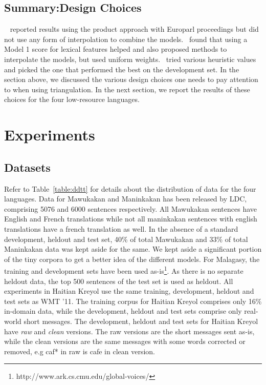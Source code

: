 \documentclass[11pt]{article}
\begin{document}
	

	\subsection{Summary:Design Choices}
		~ reported results using the product approach with Europarl proceedings but did not use any form of interpolation to combine the models.~ found that using a Model 1 score for lexical features helped and also proposed methods to interpolate the models, but used uniform weights.~ tried various heuristic values and picked the one that performed the best on the development set. In the section above, we discussed the various design choices one needs to pay attention to when using triangulation. In the next section, we report the results of these choices for the four low-resource languages. 

\section{Experiments}
\label{sec:experiments}

\subsection{Datasets}
	Refer to Table~\ref{table:ddtt} for details about the distribution of data for the four languages. Data for Mawukakan and Maninkakan has been released by LDC, comprising 5076 and 6000 sentences respectively. All Mawukakan sentences have English and French translations while not all maninkakan sentences with english translations have a french translation as well.  In the absence of a standard development, heldout and test set, 40\% of total Mawukakan and 33\% of total Maninkakan data was kept aside for the same. We kept aside a significant portion of the tiny corpora to get a better idea of the different models. For Malagasy, the training and development sets have been used as-is\footnote{http://www.ark.cs.cmu.edu/global-voices/}. As there is no separate heldout data, the top 500 sentences of the test set is used as heldout. All experiments in Haitian Kreyol use the same training, development, heldout and test sets as WMT '11. The training corpus for Haitian Kreyol comprises only 16\% in-domain data, while the development, heldout and test sets comprise only real-world short messages. The development, heldout and test sets for Haitian Kreyol have \emph{raw} and \emph{clean} versions. The raw versions are the short messages sent as-is, while the clean versions are the same messages with some words corrected or removed, e.g caf* in raw is cafe in clean version. 
\end{document}
